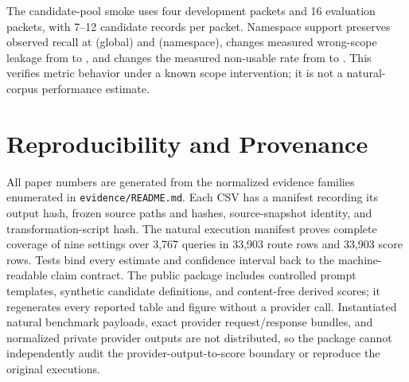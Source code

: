 \documentclass{article}
\begin{document}
The candidate-pool smoke uses four development packets and 16 evaluation packets,
with 7--12 candidate records per packet.  Namespace support preserves observed
recall at \SmokeGlobalRecall{} (global) and \SmokeNamespaceRecall{} (namespace),
  changes measured wrong-scope leakage from \SmokeGlobalWrongScope{} to
  \SmokeNamespaceWrongScope{}, and changes the measured non-usable rate from
  \SmokeGlobalNonUsableRate{} to \SmokeNamespaceNonUsableRate{}.  This verifies
metric behavior under a known scope intervention; it is not a natural-corpus
performance estimate.

\begin{table}[ht]
\centering
\caption{Candidate-pool mechanism smoke on 16 curated evaluation packets.}
\label{tab:smoke}

\end{table}

\section{Reproducibility and Provenance}

All paper numbers are generated from the normalized evidence families enumerated in
\texttt{evidence/README.md}.  Each CSV has a manifest recording its output hash,
frozen source paths and hashes,
source-snapshot identity, and transformation-script hash.  The natural execution
manifest proves complete coverage of nine settings over 3,767 queries in 33,903
route rows and 33,903 score rows.  Tests bind every estimate and confidence interval
back to the machine-readable claim contract.  The public package includes controlled
prompt templates, synthetic candidate definitions, and content-free derived scores;
it regenerates every reported table and figure without a provider call.  Instantiated
natural benchmark payloads, exact provider request/response bundles, and normalized
private provider outputs are not distributed, so the package cannot independently
audit the provider-output-to-score boundary or reproduce the original executions.


\end{document}
